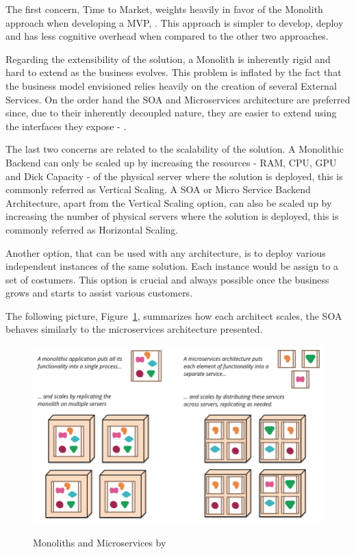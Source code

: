 The first concern, Time to Market, weights heavily in favor of the Monolith approach when developing a \gls{MVP}, \cite{atlassianmono}. This approach is simpler to develop, deploy and has less cognitive overhead when compared to the other two approaches.

Regarding the extensibility of the solution, a Monolith is inherently rigid and hard to extend as the business evolves. This problem is inflated by the fact that the business model envisioned relies heavily on the creation of several External Services. On the order hand the \gls{SOA} and Microservices architecture are preferred since, due to their inherently decoupled nature, they are easier to extend using the interfaces they expose - \cite{microsoftmicro}.

The last two concerns are related to the scalability of the solution. A Monolithic Backend can only be scaled up by increasing the resources - RAM, CPU, GPU and Dick Capacity - of the physical server where the solution is deployed, this is commonly referred as Vertical Scaling. A \gls{SOA} or Micro Service Backend Architecture, apart from the Vertical Scaling option, can also be scaled up by increasing the number of physical servers where the solution is deployed, this is commonly referred as Horizontal Scaling.

Another option, that can be used with any architecture, is to deploy various independent instances of the same solution. Each instance would be assign to a set of costumers. This option is crucial and always possible once the business grows and starts to assist various customers.

The following picture, Figure~\ref{fig:design:alternatives:auth:backend:scale}, summarizes how each architect scales, the \gls{SOA} behaves similarly to the microservices architecture presented.

\begin{figure}[H]
   \centering
   \resizebox{\columnwidth}{!}
   {
      \includegraphics{assets/figures/microservices.png}
   }
   \caption[Monoliths and Microservices]{Monoliths and Microservices by \cite{martinmicro}}
   \label{fig:design:alternatives:auth:backend:scale}
\end{figure}

